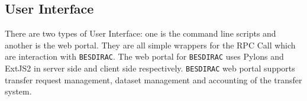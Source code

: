 \subsection{User Interface}
There are two types of User Interface: one is the command line scripts and 
another is the web portal. 
They are all simple wrappers for the RPC Call which are interaction
with {\tt BESDIRAC}.
The web portal for {\tt BESDIRAC} uses Pylons and ExtJS2 in server side and
client side respectively\cite{bib:webportal}. {\tt BESDIRAC} web portal supports
transfer request management, dataset management and  
accounting of the transfer system.
